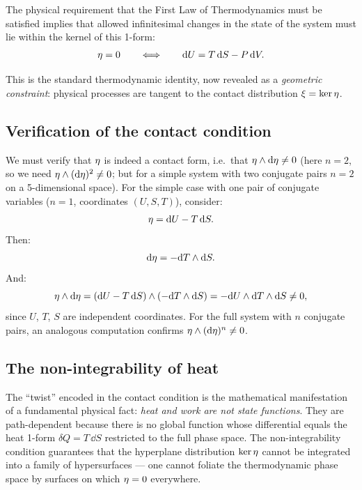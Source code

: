 The physical requirement that the First Law of Thermodynamics must be satisfied implies that allowed infinitesimal changes in the state of the system must lie within the kernel of this 1-form:
\begin{equation}
\eta = 0 \qquad \Longleftrightarrow \qquad \dd U = T\,\dd S - P\,\dd V.
\end{equation}

This is the standard thermodynamic identity, now revealed as a \emph{geometric constraint}: physical processes are tangent to the contact distribution $\xi = \ker\eta$.

\subsection{Verification of the contact condition}

We must verify that $\eta$ is indeed a contact form, i.e.\ that $\eta \wedge \dd\eta \neq 0$ (here $n = 2$, so we need $\eta \wedge (\dd\eta)^2 \neq 0$; but for a simple system with two conjugate pairs $n=2$ on a 5-dimensional space). For the simple case with one pair of conjugate variables ($n=1$, coordinates $(U, S, T)$), consider:
\begin{equation}
\eta = \dd U - T\,\dd S.
\end{equation}
Then:
\begin{equation}
\dd\eta = -\dd T \wedge \dd S.
\end{equation}
And:
\begin{equation}
\eta \wedge \dd\eta = (\dd U - T\,\dd S) \wedge (-\dd T \wedge \dd S) = -\dd U \wedge \dd T \wedge \dd S \neq 0,
\end{equation}
since $U$, $T$, $S$ are independent coordinates. For the full system with $n$ conjugate pairs, an analogous computation confirms $\eta \wedge (\dd\eta)^n \neq 0$.

\subsection{The non-integrability of heat}

The ``twist'' encoded in the contact condition is the mathematical manifestation of a fundamental physical fact: \emph{heat and work are not state functions}. They are path-dependent because there is no global function whose differential equals the heat 1-form $\delta Q = T\,\dd S$ restricted to the full phase space. The non-integrability condition guarantees that the hyperplane distribution $\ker\eta$ cannot be integrated into a family of hypersurfaces --- one cannot foliate the thermodynamic phase space by surfaces on which $\eta = 0$ everywhere.

